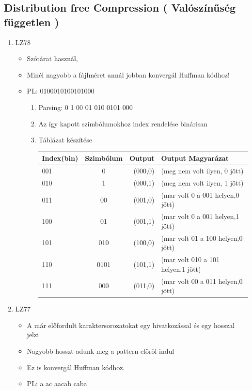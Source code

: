 \subsection{ Distribution free Compression ( Valószínűség független )}
\begin{enumerate}
	\item LZ78  %
		\begin{itemize}
			\item Szótárat használ,

			\item Minél nagyobb a fájlméret annál jobban konvergál Huffman kódhoz!

			\item PL: 0100010100101000

			\begin{enumerate}
				\item Parsing: 0 1 00 01 010 0101 000

				\item Az így kapott szimbólumokhoz index rendelése binárisan

				\item Táblázat készítése

					\begin{tabular}{|l|c|r||l|}
 					 \hline
 					 Index(bin) & Szimbólum & Output & Output Magyarázat \\ \hline \hline
 					 001 & 0    & (000,0)   & (meg nem volt ilyen, 0 jött) \\  \hline
 					 010 & 1    & (000,1)   & (meg nem volt ilyen, 1 jött)\\  \hline
 					 011 & 00   & (001,0)   & (mar volt 0 a 001 helyen,0 jött)\\  \hline
 					 100 & 01   & (001,1)   & (mar volt 0 a 001 helyen,1 jött)\\  \hline
 					 101 & 010  & (100,0)   & (mar volt 01 a 100 helyen,0 jött)\\  \hline
 					 110 & 0101 & (101,1)   & (mar volt 010 a 101 helyen,1 jött) \\  \hline
 					 111 & 000  & (011,0)   & (mar volt 00 a 011 helyen,0 jött)\\  \hline
					\end{tabular}

			\end{enumerate}


		\end{itemize}
	\item LZ77

		\begin{itemize}
			\item A már előfordult karaktersorozatokat egy hivatkozással és egy hosszal jelzi
			\item Nagyobb hosszt adunk meg a pattern előről indul
			\item Ez is konvergál Huffman kódhoz.
			\item PL: a ac aacab caba


\end{itemize}
\end{enumerate}
